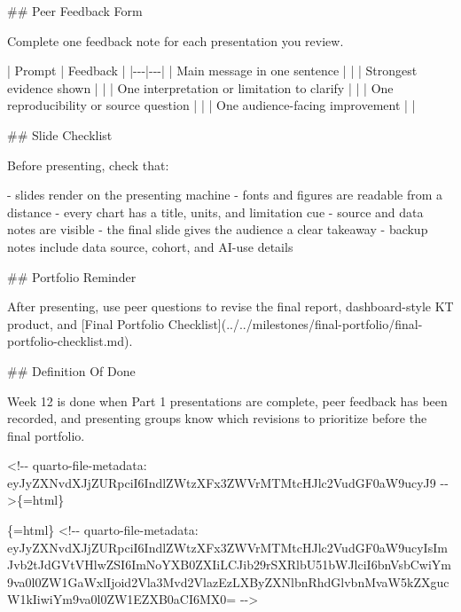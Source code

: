 \documentclass[
  letterpaper,
  DIV=11,
  numbers=noendperiod,
  oneside]{scrreprt}
\newenvironment{Shaded}{\begin{snugshade}}{\end{snugshade}}
\newcommand{\CommentTok}[1]{\textcolor[rgb]{0.37,0.37,0.37}{#1}}
\newcommand{\FunctionTok}[1]{\textcolor[rgb]{0.28,0.35,0.67}{#1}}
\newcommand{\InformationTok}[1]{\textcolor[rgb]{0.37,0.37,0.37}{#1}}
\newcommand{\NormalTok}[1]{\textcolor[rgb]{0.00,0.23,0.31}{#1}}
\newcommand{\OtherTok}[1]{\textcolor[rgb]{0.00,0.23,0.31}{#1}}
\newcommand{\PreprocessorTok}[1]{\textcolor[rgb]{0.68,0.00,0.00}{#1}}
\newcommand{\SpecialStringTok}[1]{\textcolor[rgb]{0.13,0.47,0.30}{#1}}
\begin{document}
\begin{Shaded}
\begin{Highlighting}[numbers=left,,]
\FunctionTok{\#\# Peer Feedback Form}

\NormalTok{Complete one feedback note for each presentation you review.}

\PreprocessorTok{|}\NormalTok{ Prompt }\PreprocessorTok{|}\NormalTok{ Feedback }\PreprocessorTok{|}
\PreprocessorTok{|{-}{-}{-}|{-}{-}{-}|}
\PreprocessorTok{|}\NormalTok{ Main message in one sentence }\PreprocessorTok{|}  \PreprocessorTok{|}
\PreprocessorTok{|}\NormalTok{ Strongest evidence shown }\PreprocessorTok{|}  \PreprocessorTok{|}
\PreprocessorTok{|}\NormalTok{ One interpretation or limitation to clarify }\PreprocessorTok{|}  \PreprocessorTok{|}
\PreprocessorTok{|}\NormalTok{ One reproducibility or source question }\PreprocessorTok{|}  \PreprocessorTok{|}
\PreprocessorTok{|}\NormalTok{ One audience{-}facing improvement }\PreprocessorTok{|}  \PreprocessorTok{|}

\FunctionTok{\#\# Slide Checklist}

\NormalTok{Before presenting, check that:}

\SpecialStringTok{{-} }\NormalTok{slides render on the presenting machine}
\SpecialStringTok{{-} }\NormalTok{fonts and figures are readable from a distance}
\SpecialStringTok{{-} }\NormalTok{every chart has a title, units, and limitation cue}
\SpecialStringTok{{-} }\NormalTok{source and data notes are visible}
\SpecialStringTok{{-} }\NormalTok{the final slide gives the audience a clear takeaway}
\SpecialStringTok{{-} }\NormalTok{backup notes include data source, cohort, and AI{-}use details}

\FunctionTok{\#\# Portfolio Reminder}

\NormalTok{After presenting, use peer questions to revise the final report, dashboard{-}style KT product, and }\CommentTok{[}\OtherTok{Final Portfolio Checklist}\CommentTok{](../../milestones/final{-}portfolio/final{-}portfolio{-}checklist.md)}\NormalTok{.}

\FunctionTok{\#\# Definition Of Done}

\NormalTok{Week 12 is done when Part 1 presentations are complete, peer feedback has been recorded, and presenting groups know which revisions to prioritize before the final portfolio.}


\InformationTok{\textasciigrave{}\textless{}!{-}{-} quarto{-}file{-}metadata: eyJyZXNvdXJjZURpciI6IndlZWtzXFx3ZWVrMTMtcHJlc2VudGF0aW9ucyJ9 {-}{-}\textgreater{}\textasciigrave{}}\NormalTok{\{=html\}}

\InformationTok{\textasciigrave{}\textasciigrave{}\textasciigrave{}\{=html\}}
\InformationTok{\textless{}!{-}{-} quarto{-}file{-}metadata: eyJyZXNvdXJjZURpciI6IndlZWtzXFx3ZWVrMTMtcHJlc2VudGF0aW9ucyIsImJvb2tJdGVtVHlwZSI6ImNoYXB0ZXIiLCJib29rSXRlbU51bWJlciI6bnVsbCwiYm9va0l0ZW1GaWxlIjoid2Vla3Mvd2VlazEzLXByZXNlbnRhdGlvbnMvaW5kZXgucW1kIiwiYm9va0l0ZW1EZXB0aCI6MX0= {-}{-}\textgreater{}}
\InformationTok{\textasciigrave{}\textasciigrave{}\textasciigrave{}}


\end{Highlighting}
\end{Shaded}
\end{document}
